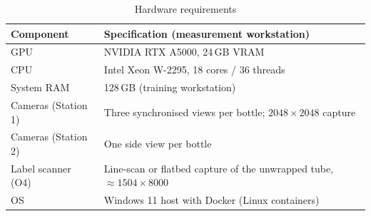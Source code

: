 \begin{table}[htbp]
\centering
\caption{Hardware requirements}
\label{tab:hardware-req}
\begin{tabularx}{\textwidth}{|L{3.6cm}|X|}
\hline
\textbf{Component} & \textbf{Specification (measurement workstation)} \\ \hline
GPU & NVIDIA RTX A5000, 24\,GB VRAM \\ \hline
CPU & Intel Xeon W-2295, 18 cores / 36 threads \\ \hline
System RAM & 128\,GB (training workstation) \\ \hline
Cameras (Station 1) & Three synchronised views per bottle; $2048{\times}2048$ capture \\ \hline
Cameras (Station 2) & One side view per bottle \\ \hline
Label scanner (O4) & Line-scan or flatbed capture of the unwrapped tube, $\approx1504{\times}8000$ \\ \hline
OS & Windows 11 host with Docker (Linux containers) \\ \hline
\end{tabularx}
\end{table}
